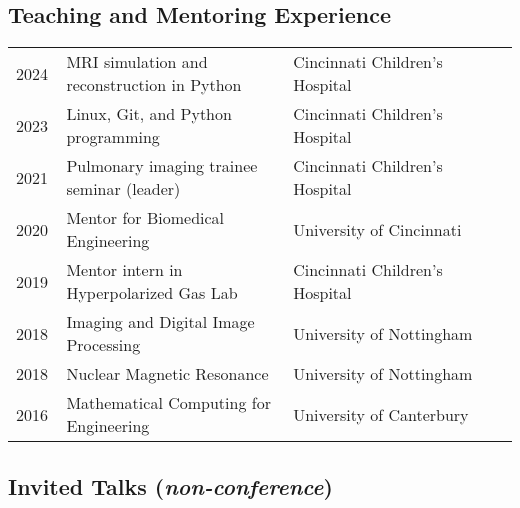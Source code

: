 \documentclass[12pt,]{scrartcl}
\begin{document}
\subsection{Teaching and Mentoring Experience}\label{teaching}

\begin{table}[!h]
{\def\arraystretch{1.5}\tabcolsep=0pt
\begin{tabular}{p{0.10\linewidth}p{0.45\linewidth}p{0.45\linewidth}}

2024 & MRI simulation and reconstruction in Python & Cincinnati Children's Hospital \\

2023 & Linux, Git, and Python programming & Cincinnati Children's Hospital \\

2021 & Pulmonary imaging trainee seminar (leader) & Cincinnati Children's Hospital\\

2020 & Mentor for Biomedical Engineering & University of Cincinnati\\

 2019 & Mentor intern in Hyperpolarized Gas Lab & Cincinnati Children's Hospital\\
  
  2018 & Imaging and Digital Image Processing & University of Nottingham \\
  
  2018 & Nuclear Magnetic Resonance & University of Nottingham  \\

 2016 & Mathematical Computing for Engineering & University of Canterbury  \\
  
\end{tabular}%
}
\end{table}

\subsection{Invited Talks (\textit{non-conference})}\label{presentations-and-talks}
\end{document}
